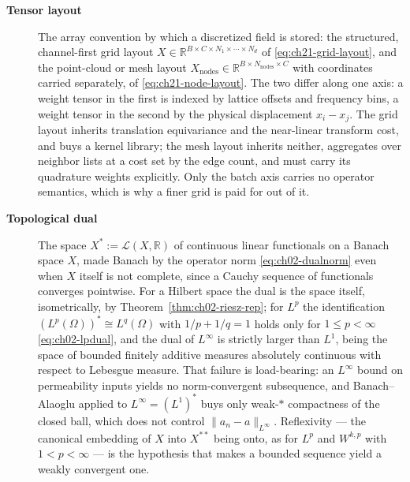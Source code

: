 \begin{description}
\item[\textbf{Tensor layout}] The array convention by which a discretized field is stored:
the structured, channel-first grid layout $X \in \mathbb{R}^{B \times C \times N_{1} \times
\cdots \times N_{d}}$ of \eqref{eq:ch21-grid-layout}, and the point-cloud or mesh layout
$X_{\text{nodes}} \in \mathbb{R}^{B \times N_{\text{nodes}} \times C}$ with coordinates
carried separately, of \eqref{eq:ch21-node-layout}. The two differ along one axis: a weight
tensor in the first is indexed by lattice offsets and frequency bins, a weight tensor in the
second by the physical displacement $x_{i} - x_{j}$. The grid layout inherits translation
equivariance and the near-linear transform cost, and buys a kernel library; the mesh layout
inherits neither, aggregates over neighbor lists at a cost set by the edge count, and must
carry its quadrature weights explicitly. Only the batch axis carries no operator semantics,
which is why a finer grid is paid for out of it. 

\item[\textbf{Topological dual}] The space $X^{*} := \mathcal{L}(X, \mathbb{R})$ of
continuous linear functionals on a Banach space $X$, made Banach by the operator norm
\eqref{eq:ch02-dualnorm} even when $X$ itself is not complete, since a Cauchy sequence of
functionals converges pointwise. For a Hilbert space the dual is the space itself,
isometrically, by Theorem~\ref{thm:ch02-riesz-rep}; for $L^{p}$ the identification
$(L^{p}(\Omega))^{*} \cong L^{q}(\Omega)$ with $1/p + 1/q = 1$ holds only for
$1 \le p < \infty$ \eqref{eq:ch02-lpdual}, and the dual of $L^{\infty}$ is strictly larger
than $L^{1}$, being the space of bounded finitely additive measures absolutely continuous
with respect to Lebesgue measure. That failure is load-bearing: an $L^{\infty}$ bound on
permeability inputs yields no norm-convergent subsequence, and Banach--Alaoglu applied to
$L^{\infty} = (L^{1})^{*}$ buys only weak-$*$ compactness of the closed ball, which does
not control $\|a_{n} - a\|_{L^{\infty}}$. Reflexivity --- the canonical embedding of
$X$ into $X^{**}$ being onto, as for $L^{p}$ and $W^{k,p}$ with $1 < p < \infty$ --- is
the hypothesis that makes a bounded sequence yield a weakly convergent one.


\end{description}
